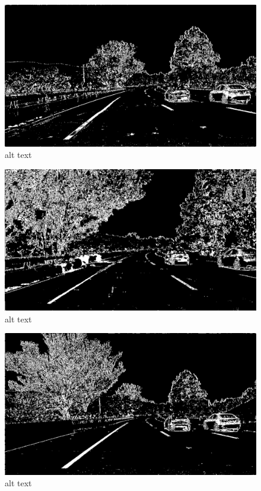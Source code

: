 \documentclass[11pt]{article}
\makeatletter
\def\maxwidth{\ifdim\Gin@nat@width>\linewidth\linewidth
    \else\Gin@nat@width\fi}
\let\Oldincludegraphics\includegraphics
\renewcommand{\includegraphics}[1]{\Oldincludegraphics[width=.8\maxwidth]{#1}}
\makeatother
\begin{document}
\begin{figure}
\centering
\includegraphics{./output_images/test4_binary_thresholded.jpg}
\caption{alt text}
\end{figure}

\begin{figure}
\centering
\includegraphics{./output_images/test5_binary_thresholded.jpg}
\caption{alt text}
\end{figure}

\begin{figure}
\centering
\includegraphics{./output_images/test6_binary_thresholded.jpg}
\caption{alt text}
\end{figure}
\end{document}
